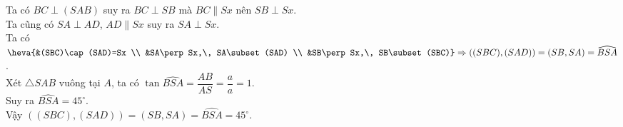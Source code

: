 \begin{bt}
{\begin{enumerate}
			Ta có $BC\perp (SAB)$ suy ra $BC\perp SB$ mà $BC\parallel Sx$ nên $SB\perp Sx$. \\
			Ta cũng có $SA\perp AD$, $AD\parallel Sx$ suy ra $SA\perp Sx$. \\
			Ta có $\heva{&(SBC)\cap (SAD)=Sx \\ &SA\perp Sx,\, SA\subset (SAD) \\ &SB\perp Sx,\, SB\subset (SBC)}\Rightarrow ((SBC),(SAD)) = (SB,SA) = \widehat{BSA}$. \\
			Xét $\triangle SAB$ vuông tại $A$, ta có 
			$\tan\widehat{BSA} = \dfrac{AB}{AS} = \dfrac{a}{a} = 1$. \\
			Suy ra $\widehat{BSA} = 45^\circ$. \\
			Vậy $((SBC),(SAD)) = (SB,SA) = \widehat{BSA}=45^\circ$.
		\end{enumerate}
	}
\end{bt}


